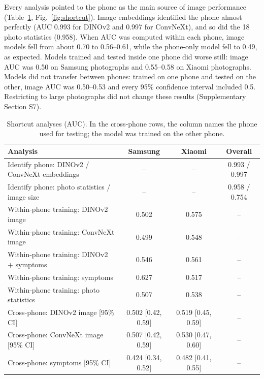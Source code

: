 \documentclass[preprint,12pt]{elsarticle}
\begin{document}
Every analysis pointed to the phone as the main source of image performance (Table~\ref{tab:shortcut}, Fig.~\ref{fig:shortcut}). Image embeddings identified the phone almost perfectly (AUC 0.993 for DINOv2 and 0.997 for ConvNeXt), and so did the 18 photo statistics (0.958). When AUC was computed within each phone, image models fell from about 0.70 to 0.56--0.61, while the phone-only model fell to 0.49, as expected. Models trained and tested inside one phone did worse still: image AUC was 0.50 on Samsung photographs and 0.55--0.58 on Xiaomi photographs. Models did not transfer between phones: trained on one phone and tested on the other, image AUC was 0.50--0.53 and every 95\% confidence interval included 0.5. Restricting to large photographs did not change these results (Supplementary Section S7).

\begin{table}[!htbp]
\centering
\footnotesize
\caption{Shortcut analyses (AUC). In the cross-phone rows, the column names the phone used for testing; the model was trained on the other phone.}
\label{tab:shortcut}
\setlength{\tabcolsep}{4pt}
\begin{tabular}{@{}>{\raggedright\arraybackslash}p{5.8cm}ccc@{}}
\toprule
Analysis & Samsung & Xiaomi & Overall \\
\midrule
Identify phone: DINOv2 / ConvNeXt embeddings & -- & -- & 0.993 / 0.997 \\
Identify phone: photo statistics / image size & -- & -- & 0.958 / 0.754 \\
\addlinespace
Within-phone training: DINOv2 image & 0.502 & 0.575 & -- \\
Within-phone training: ConvNeXt image & 0.499 & 0.548 & -- \\
Within-phone training: DINOv2 + symptoms & 0.546 & 0.561 & -- \\
Within-phone training: symptoms & 0.627 & 0.517 & -- \\
Within-phone training: photo statistics & 0.507 & 0.538 & -- \\
\addlinespace
Cross-phone: DINOv2 image [95\% CI] & 0.502 [0.42, 0.59] & 0.519 [0.45, 0.59] & -- \\
Cross-phone: ConvNeXt image [95\% CI] & 0.507 [0.42, 0.59] & 0.530 [0.47, 0.60] & -- \\
Cross-phone: symptoms [95\% CI] & 0.424 [0.34, 0.52] & 0.482 [0.41, 0.55] & -- \\
\bottomrule
\end{tabular}
\end{table}
\end{document}
